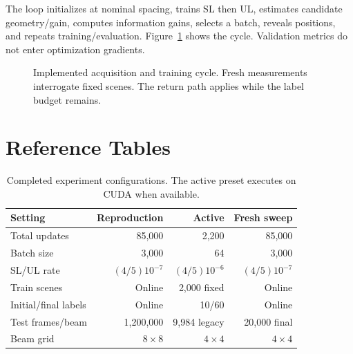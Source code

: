 \documentclass[conference]{IEEEtran}
\begin{document}
The loop initializes at nominal spacing, trains SL then UL, estimates candidate geometry/gain, computes information gains, selects a batch, reveals positions, and repeats training/evaluation. Figure~\ref{fig:workflow} shows the cycle. Validation metrics do not enter optimization gradients.
\begin{figure}[!htb]\centering
{}
\caption{Implemented acquisition and training cycle. Fresh measurements interrogate fixed scenes. The return path applies while the label budget remains.}\label{fig:workflow}
\end{figure}\section{Reference Tables}
\begin{table}[t]\centering\small
\caption{Completed experiment configurations. The active preset executes on CUDA when available.}\label{tab:settings-final}
\setlength{\tabcolsep}{3pt}
\begin{tabular}{lrrr}\toprule
Setting & Reproduction & Active & Fresh sweep\\\midrule
Total updates & 85,000 & 2,200 & 85,000\\
Batch size & 3,000 & 64 & 3,000\\
SL/UL rate & $(4/5)10^{-7}$ & $(4/5)10^{-6}$ & $(4/5)10^{-7}$\\
Train scenes & Online & 2,000 fixed & Online\\
Initial/final labels & Online & 10/60 & Online\\
Test frames/beam & 1,200,000 & 9,984 legacy & 20,000 final\\
Beam grid & $8\times8$ & $4\times4$ & $4\times4$\\
\bottomrule\end{tabular}
\end{table}
\end{document}

